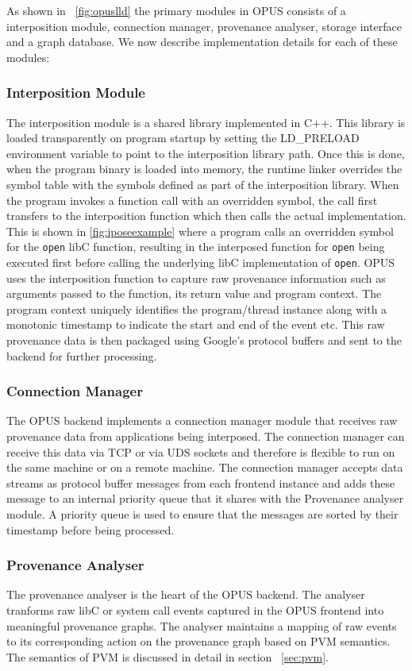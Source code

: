 \documentclass[withindex,glossary]{cam-thesis}
\begin{document}
As shown in ~\ref{fig:opuslld} the primary modules in OPUS consists of a interposition module, connection manager, provenance analyser, storage interface and a graph database.
We now describe implementation details for each of these modules:

\subsubsection{Interposition Module}
The interposition module is a shared library implemented in C++.
This library is loaded transparently on program startup by setting the LD\_PRELOAD environment variable to point to the interposition library path.
Once this is done, when the program binary is loaded into memory, the runtime linker overrides the symbol table with the symbols defined as part of the interposition library.
When the program invokes a function call with an overridden symbol, the call first transfers to the interposition function which then calls the actual implementation. 
This is shown in \ref{fig:iposeexample} where a program calls an overridden symbol for the \texttt{open} libC function, resulting in the interposed function for \texttt{open} being executed first before calling the underlying libC implementation of \texttt{open}.
OPUS uses the interposition function to capture raw provenance information such as arguments passed to the function, its return value and program context.
The program context uniquely identifies the program/thread instance along with a monotonic timestamp to indicate the start and end of the event etc.
This raw provenance data is then packaged using Google's protocol buffers and sent to the backend for further processing.


\subsubsection{Connection Manager}
The OPUS backend implements a connection manager module that receives raw provenance data from applications being interposed.
The connection manager can receive this data via TCP or via UDS sockets and therefore is flexible to run on the same machine or on a remote machine.
The connection manager accepts data streams as protocol buffer messages from each frontend instance and adds these message to an internal priority queue that it shares with the Provenance analyser module.
A priority queue is used to ensure that the messages are sorted by their timestamp before being processed.

\subsubsection{Provenance Analyser}
The provenance analyser is the heart of the OPUS backend.
The analyser tranforms raw libC or system call events captured in the OPUS frontend into meaningful provenance graphs.
The analyser maintains a mapping of raw events to its corresponding action on the provenance graph based on PVM semantics.
The semantics of PVM is discussed in detail in section ~\ref{sec:pvm}.
\end{document}
